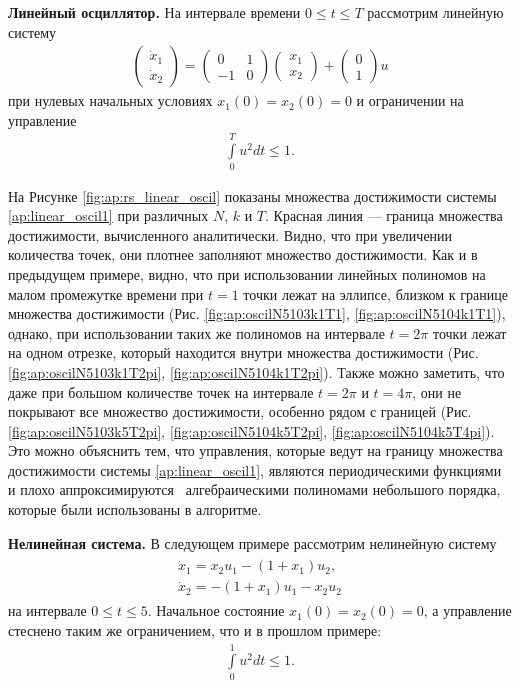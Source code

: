 \documentclass[../main.tex]{subfiles}
\begin{document}
 \textbf{Линейный осциллятор.} На интервале времени $ 0 \leqslant t \leqslant T$ рассмотрим линейную систему 
 \begin{gather}\label{ap:linear_oscil1}
 	\begin{pmatrix} 
 		\dot{x}_1 \\
 		\dot{x}_2 
 	\end{pmatrix} = 
 	\begin{pmatrix}
 		0 & 1 \\
 		-1 & 0
 	\end{pmatrix}
 	\begin{pmatrix} 
 		x_1 \\
 		x_2 
 	\end{pmatrix} +
 	\begin{pmatrix} 0 \\ 1
 	\end{pmatrix} u
 \end{gather}
 при нулевых начальных условиях $x_1(0) = x_2(0) = 0 $ и ограничении на управление 
 \begin{gather*}
 	\int\limits_0^T u^2dt \leqslant 1.
 \end{gather*}
 
 На Рисунке \ref{fig:ap:rs_linear_oscil} показаны множества достижимости системы \eqref{ap:linear_oscil1} при различных $N$, $k$ и $T$.
 Красная линия --- граница множества достижимости, вычисленного аналитически.
 Видно, что при увеличении количества точек, они плотнее заполняют множество достижимости.
 Как и в предыдущем примере, видно, что при использовании линейных полиномов на малом промежутке времени при $t = 1$ точки лежат на эллипсе, близком к границе множества достижимости (Рис. \ref{fig:ap:oscilN5103k1T1}, \ref{fig:ap:oscilN5104k1T1}), однако, при использовании таких же полиномов на интервале $t = 2\pi$ точки лежат на одном отрезке, который находится внутри множества достижимости (Рис. \ref{fig:ap:oscilN5103k1T2pi}, \ref{fig:ap:oscilN5104k1T2pi}). 
 Также можно заметить, что даже при большом количестве точек на интервале $t = 2\pi$ и $t = 4\pi$, они не покрывают все множество достижимости, особенно рядом с границей (Рис. \ref{fig:ap:oscilN5103k5T2pi}, \ref{fig:ap:oscilN5104k5T2pi}, \ref{fig:ap:oscilN5104k5T4pi}). 
 Это можно объяснить тем, что управления, которые ведут на границу множества достижимости системы \eqref{ap:linear_oscil1}, являются периодическими функциями и плохо аппроксимируются  алгебраическими полиномами небольшого порядка, которые были использованы в алгоритме.
 
 \textbf{Нелинейная система.} В следующем примере рассмотрим нелинейную систему 
 \begin{gather}\label{ap:nonlinear_system1}
 	\begin{gathered}
 	\dot{x}_1 = x_2 u_1 - (1 + x_1) u_2,\\
 	\dot{x}_2 = -(1 + x_1) u_1 - x_2 u_2
 	\end{gathered}
 \end{gather}
 на интервале $ 0 \leqslant t \leqslant 5$.
 Начальное состояние $x_1(0) = x_2(0) = 0 $, а управление стеснено таким же ограничением, что и в прошлом примере:
 \begin{gather*}
 	\int\limits_0^1 u^2dt \leqslant 1.
 \end{gather*}
 
\end{document}
